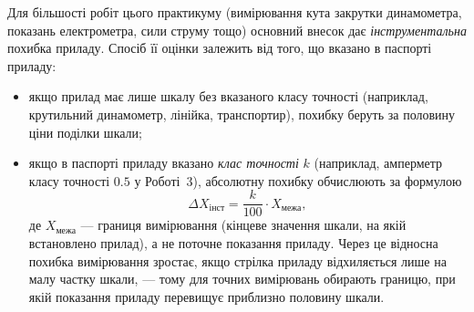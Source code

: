 Для більшості робіт цього практикуму (вимірювання кута закрутки
динамометра, показань електрометра, сили струму тощо) основний внесок
дає \emph{інструментальна} похибка приладу. Спосіб її оцінки залежить
від того, що вказано в паспорті приладу:
\begin{itemize}
	\item якщо прилад має лише шкалу без вказаного класу точності
	(наприклад, крутильний динамометр, лінійка, транспортир), похибку
	беруть за половину ціни поділки шкали;
	\item якщо в паспорті приладу вказано \emph{клас точності} $k$
	(наприклад, амперметр класу точності $0.5$ у Роботі~3), абсолютну
	похибку обчислюють за формулою
	\begin{equation}\label{eq:accuracy_class}
		\Delta X_\text{інст} = \frac{k}{100}\cdot X_\text{межа},
	\end{equation}
	де $X_\text{межа}$ --- границя вимірювання (кінцеве значення
	шкали, на якій встановлено прилад), а не поточне показання
	приладу. Через це відносна похибка вимірювання зростає, якщо
	стрілка приладу відхиляється лише на малу частку шкали, --- тому
	для точних вимірювань обирають границю, при якій показання
	приладу перевищує приблизно половину шкали.

\begin{center}
\end{center}
\end{itemize}

